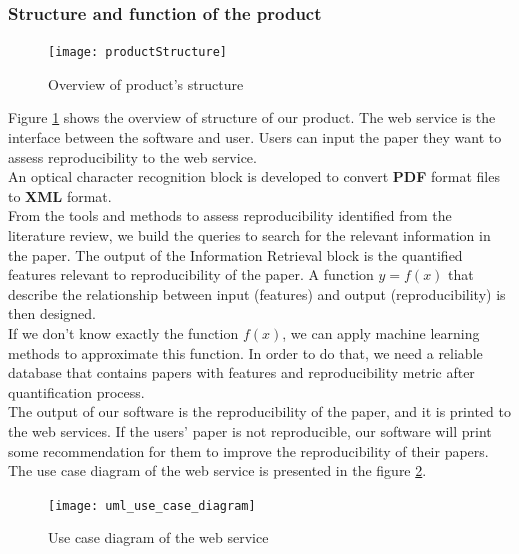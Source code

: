 \documentclass[
10pt, %
a4paper, %
oneside, %
headinclude,footinclude, %
BCOR5mm, %
]{scrartcl}
\begin{document}
\subsubsection{Structure and function of the product}
\begin{figure}[!hbt]
\centering
\texttt{[image: productStructure]}
\caption{Overview of product's structure}
\label{fig:productStructure}
\end{figure}
Figure \ref{fig:productStructure} shows the overview of structure of our product.
The web service is the interface between the software and user.
Users can input the paper they want to assess reproducibility to the web service.\\
An optical character recognition block is developed to convert \textbf{PDF} format files to \textbf{XML} format.\\
From the tools and methods to assess reproducibility identified from the literature review, we build the queries to search for the relevant information in the paper.
The output of the Information Retrieval block is the quantified features relevant to reproducibility of the paper.
A function $y=f(x)$ that describe the relationship between input (features) and output (reproducibility) is then designed.\\
If we don't know exactly the function $f(x)$, we can apply machine learning methods to approximate this function. In order to do that, we need a reliable database that contains papers with features and reproducibility metric after quantification process.\\
The output of our software is the reproducibility of the paper, and it is printed to the web services. If the users' paper is not reproducible, our software will print some recommendation for them to improve the reproducibility of their papers. The use case diagram of the web service is presented in the figure \ref{fig:uml_use_case_diagram}.\\

\begin{figure}[!hbt]
\centering
\texttt{[image: uml\_use\_case\_diagram]}
\caption{Use case diagram of the web service}
\label{fig:uml_use_case_diagram}
\end{figure}
\end{document}

